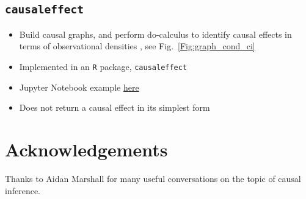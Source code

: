 \documentclass[11pt]{article}
\numberwithin{equation}{section}
\begin{document}
\subsection{\texttt{causaleffect}} \label{sec:soft-causaleffect}
\begin{itemize}[noitemsep]
\item Build causal graphs, and perform do-calculus to identify causal effects in terms of observational densities \cite{tikka17}, see Fig.~\ref{Fig:graph_cond_ci}
\item Implemented in an \texttt{R} package, \texttt{causaleffect}
\item Jupyter Notebook example \href{https://github.com/jaryaman/ML_demos/blob/master/Notebooks/do-calculus.ipynb}{here}
\item Does not return a causal effect in its simplest form
\end{itemize}

\section*{Acknowledgements}
Thanks to Aidan Marshall for many useful conversations on the topic of causal inference. 

\newpage
 
\end{document}
